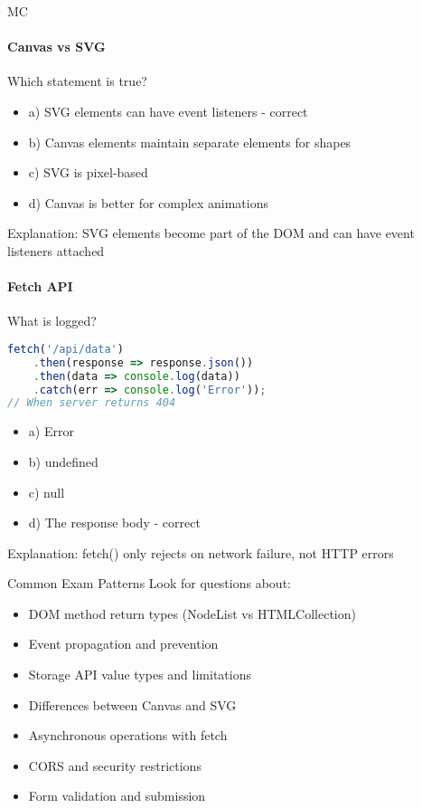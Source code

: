 \begin{KR}{MC}
\paragraph{Canvas vs SVG}
Which statement is true?
\begin{itemize}
    \item a) SVG elements can have event listeners - correct
    \item b) Canvas elements maintain separate elements for shapes
    \item c) SVG is pixel-based
    \item d) Canvas is better for complex animations
\end{itemize}
Explanation: SVG elements become part of the DOM and can have event listeners attached

\paragraph{Fetch API}
What is logged?
\begin{lstlisting}[language=JavaScript, style=basesmol]
fetch('/api/data')
    .then(response => response.json())
    .then(data => console.log(data))
    .catch(err => console.log('Error'));
// When server returns 404
\end{lstlisting}
\begin{itemize}
    \item a) Error
    \item b) undefined
    \item c) null
    \item d) The response body - correct
\end{itemize}
Explanation: fetch() only rejects on network failure, not HTTP errors
\end{KR}

\begin{concept}{Common Exam Patterns}
Look for questions about:
\begin{itemize}
    \item DOM method return types (NodeList vs HTMLCollection)
    \item Event propagation and prevention
    \item Storage API value types and limitations
    \item Differences between Canvas and SVG
    \item Asynchronous operations with fetch
    \item CORS and security restrictions
    \item Form validation and submission
\end{itemize}
\end{concept}

